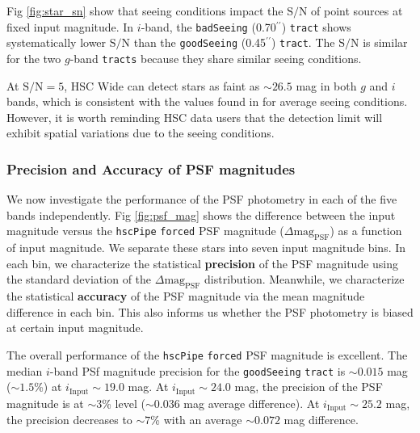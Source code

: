 \documentclass[useamsfonts]{pasj01}
\def\asec{$^{\prime\prime}$}
\def\hscpipe{\texttt{hscPipe}}
\def\forced{\texttt{forced}}
\def\tract{\texttt{tract}}
\def\tracts{\texttt{tracts}}
\def\s2n{{$\mathrm{S}/\mathrm{N}$}}
\begin{document}
    Fig \ref{fig:star_sn} show that seeing conditions impact the \s2n{} of point
    sources at fixed input magnitude.
    In $i$-band, the \texttt{badSeeing} (0.70\asec{}) \tract{} shows systematically
    lower \s2n{} than the \texttt{goodSeeing} (0.45\asec{}) \tract{}.
    The \s2n{} is similar for the two $g$-band \tracts{} because they share similar 
    seeing conditions. 

    At \s2n{}$=5$, HSC Wide can detect stars as faint as ${\sim}26.5$ mag in both $g$ 
    and $i$ bands, which is consistent with the values found in \citet{HSCDR1} for 
    average seeing conditions.
    However, it is worth reminding HSC data users that the detection
    limit will exhibit spatial variations due to the seeing conditions.

\subsubsection{Precision and Accuracy of PSF magnitudes}

    We now investigate the performance of the PSF photometry in each of the five bands
    independently. 
    Fig \ref{fig:psf_mag} shows the difference between the input magnitude versus the
    \hscpipe{} \forced{} PSF magnitude ($\Delta \mathrm{mag}_{\mathrm{PSF}}$) as a 
    function of input magnitude. 
    We separate these stars into seven input magnitude bins.  
    In each bin, we characterize the statistical \textbf{precision} of the PSF 
    magnitude using the standard deviation of the $\Delta \mathrm{mag}_{\mathrm{PSF}}$ 
    distribution.
    Meanwhile, we characterize the statistical \textbf{accuracy} of the PSF magnitude 
    via the mean magnitude difference in each bin. 
    This also informs us whether the PSF photometry is biased at certain input 
    magnitude.
    
    The overall performance of the \hscpipe{} \forced{} PSF magnitude is excellent. 
    The median $i$-band PSf magnitude precision for the \texttt{goodSeeing} \tract{} 
    is ${\sim}0.015$ mag (${\sim}1.5$\%) at $i_{\mathrm{Input}}{\sim}19.0$ mag. 
    At $i_{\mathrm{Input}}{\sim}24.0$ mag, the precision of the PSF magnitude is 
    at ${\sim}3$\% level (${\sim}0.036$ mag average difference).
    At $i_{\mathrm{Input}}{\sim}25.2$ mag, the precision decreases to
    ${\sim}7$\% with an average ${\sim}0.072$ mag difference.
    
\end{document}
